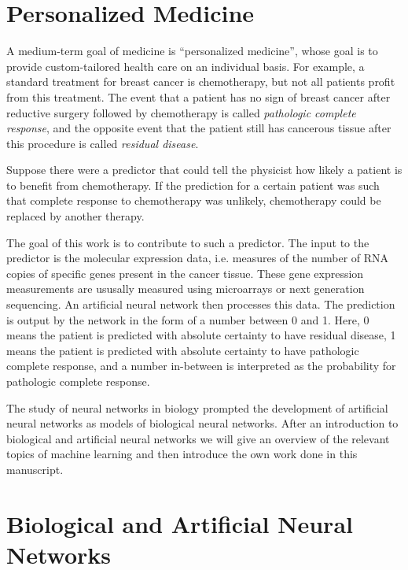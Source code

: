 
\section{Personalized Medicine}

A medium-term goal of medicine is ``personalized medicine'',
whose goal is to provide custom-tailored health care on an individual
basis. For example, a standard treatment for breast cancer is chemotherapy,
but not all patients profit from this treatment. The event that a
patient has no sign of breast cancer after reductive surgery followed
by chemotherapy is called \emph{pathologic complete response},
and the opposite event that the patient still has cancerous tissue
after this procedure is called \emph{residual disease}.

Suppose there were a predictor that could tell the physicist how likely
a patient is to benefit from chemotherapy. If the prediction for a
certain patient was such that complete response to chemotherapy was
unlikely, chemotherapy could be replaced by another therapy.

The goal of this work is to contribute to such a predictor. The input
to the predictor is the molecular expression data, i.e. measures of
the number of RNA copies of specific genes present in the cancer tissue.
These gene expression measurements are ususally measured using microarrays
or next generation sequencing. An artificial neural network then processes
this data. The prediction is output by the network in the form of
a number between 0 and 1. Here, 0 means the patient is predicted with
absolute certainty to have residual disease, 1 means the patient is
predicted with absolute certainty to have pathologic complete response,
and a number in-between is interpreted as the probability for pathologic
complete response.

The study of neural networks in biology prompted the development of
artificial neural networks as models of biological neural networks.
After an introduction to biological and artificial neural networks
we will give an overview of the relevant topics of machine learning
and then introduce the own work done in this manuscript.

\section{Biological and Artificial Neural Networks}

